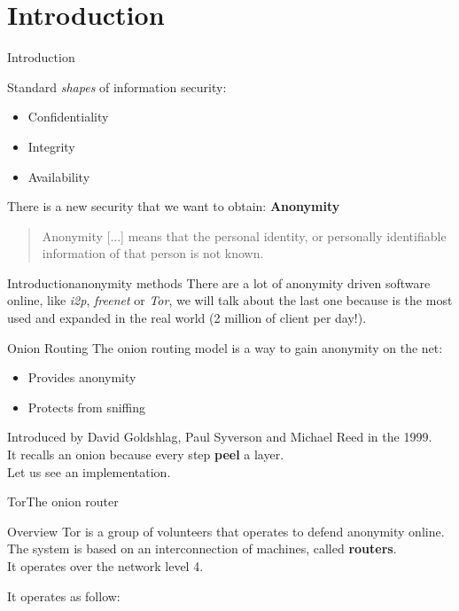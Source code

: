 \section{Introduction}
\begin{frame}{Introduction}{}
\begin{block}{Standard \emph{shapes} of information security:}
	\begin{itemize}
		\item Confidentiality
		\item Integrity
		\item Availability
	\end{itemize}
\end{block}
	There is a new security that we want to obtain: \textbf{Anonymity}
\begin{quote}
	Anonymity [...] means that the personal identity,
	or personally identifiable information of that person is not known.
\end{quote}
\end{frame}

\begin{frame}{Introduction}{anonymity methods}
There are a lot of anonymity driven software online, like \textit{i2p},
\textit{freenet} or \textit{Tor}, we will talk about the last one because
is the most used and expanded in the real world
(2 million of client per day!).
\end{frame}

\begin{frame}{Onion Routing}{}
The onion routing model is a way to gain anonymity on the net:
\begin{itemize}
	\item Provides anonymity
	\item Protects from sniffing
\end{itemize}
Introduced by David Goldshlag, Paul Syverson and Michael Reed in the 1999.
\\
It recalls an onion because every step \textbf{peel} a layer.
\\
Let us see an implementation.
\end{frame}

\begin{frame}{Tor}{The onion router}
\begin{block}{Overview}
Tor is a group of volunteers that operates to defend anonymity online.\\
The system is based on an interconnection of machines, called \textbf{routers}.\\
It operates over the network level 4.
\end{block}
It operates as follow:
\end{frame}

